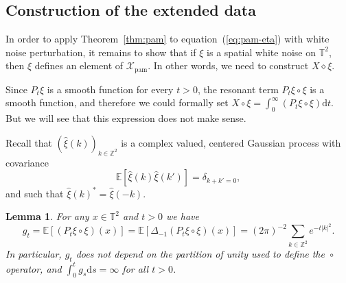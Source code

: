 \documentclass[a4paper,11pt]{article}
\newcommand{\mathd}{\mathrm{d}}
\newcommand{\tmop}[1]{\ensuremath{\operatorname{#1}}}
\newtheorem{lemma}{Lemma}
{\theorembodyfont{\rmfamily}\newtheorem{remark}{Remark}}
\newcommand{\reso}{\,\mathord{\circ}\,}
\newcommand{\renorm}{\,\mathord{\diamond}\,}
\begin{document}
\subsection{Construction of the extended data}

In order to apply Theorem~\ref{thm:pam} to equation~(\ref{eq:pam-eta}) with
white noise perturbation, it remains to show that if $\xi$ is a spatial white
noise on $\mathbb{T}^2$, then $\xi$ defines an element of
$\mathcal{X}_{\tmop{pam}}$. In other words, we need to construct $X \renorm
\xi$.

Since $P_t \xi$ is a smooth function for every $t > 0$, the resonant term $P_t
\xi \reso \xi$ is a smooth function, and therefore we could formally set $X
\reso \xi = \int_0^{\infty} (P_t \xi \reso \xi) \mathd t$. But we will see
that this expression does not make sense.

Recall that $(\hat{\xi} (k))_{k \in \mathbb{Z}^2}$ is a complex valued,
centered Gaussian process with covariance
\begin{equation}
  \label{eq:wn covariance} \mathbb{E} [\hat{\xi} (k) \hat{\xi} (k')] =
  \delta_{k + k' = 0},
\end{equation}
and such that $\hat{\xi} (k)^{\ast} = \hat{\xi} (- k)$.

\begin{lemma}
  \label{l:anderson area expectation} For any $x \in \mathbb{T}^2$ and $t > 0$
  we have
  \[ g_t =\mathbb{E} [(P_t \xi \reso \xi) (x)] =\mathbb{E} [\Delta_{- 1}
     (P_t \xi \reso \xi) (x)] = (2 \pi)^{- 2} \sum_{k \in \mathbb{Z}^2} e^{- t
     |k|^2} . \]
  In particular, $g_t$ does not depend on the partition of unity used to
  define the $\reso$ operator, and $\int_0^t g_s \mathd s = \infty$ for all $t
  > 0$.
\end{lemma}
\end{document}
